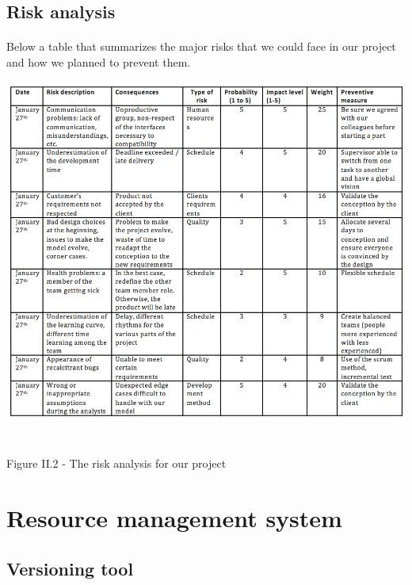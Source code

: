 \documentclass{report}
\begin{document}
\subsection{Risk analysis}


\paragraph{}
\hspace{4mm}\textnormal{Below a table that summarizes the major risks that we could face in our project and how we planned to prevent them.}

\begin{center}
\includegraphics[scale=1.0]{data/RiskManagement.png}
~\\~\\Figure II.2 - The risk analysis for our project
\end{center}

\section{Resource management system}

\subsection{Versioning tool}
\end{document}
